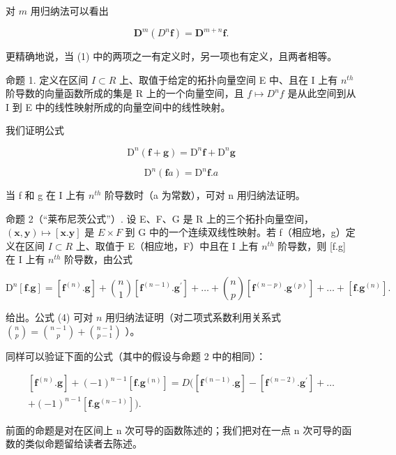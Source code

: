 对 \(m\) 用归纳法可以看出

\[
\mathbf {D} ^ {m} (D ^ {n} \mathbf {f}) = \mathbf {D} ^ {m + n} \mathbf {f}.\tag{1}
\]

更精确地说，当 (1) 中的两项之一有定义时，另一项也有定义，且两者相等。

命题 1. 定义在区间 \(I \subset R\) 上、取值于给定的拓扑向量空间 E 中、且在 I 上有 \(n^{th}\) 阶导数的向量函数所成的集是 R 上的一个向量空间，且 \(f \mapsto D^{n}f\) 是从此空间到从 I 到 E 中的线性映射所成的向量空间中的线性映射。

我们证明公式

\[
\mathrm{D} ^ {n} (\mathbf {f} + \mathbf {g}) = \mathrm{D} ^ {n} \mathbf {f} + \mathrm{D} ^ {n} \mathbf {g}\tag{2}
\]

\[
\mathrm{D} ^ {n} (\mathbf {f} a) = \mathrm{D} ^ {n} \mathbf {f}. a\tag{3}
\]

当 f 和 g 在 I 上有 \(n^{th}\) 阶导数时（a 为常数），可对 n 用归纳法证明。

命题 2（“莱布尼茨公式”）. 设 E、F、G 是 R 上的三个拓扑向量空间，\((\mathbf{x}, \mathbf{y}) \mapsto [\mathbf{x}.\mathbf{y}]\) 是 \(E \times F\) 到 G 中的一个连续双线性映射。若 f（相应地，g）定义在区间 \(I \subset R\) 上、取值于 E（相应地，F）中且在 I 上有 \(n^{th}\) 阶导数，则 {[}f.g{]} 在 I 上有 \(n^{th}\) 阶导数，由公式

\[
\mathrm{D} ^ {n} [ \mathbf {f}. \mathbf {g} ] = [ \mathbf {f} ^ {(n)}. \mathbf {g} ] + \binom {n} {1} [ \mathbf {f} ^ {(n - 1)}. \mathbf {g} ^ {\prime} ] + \dots + \binom {n} {p} [ \mathbf {f} ^ {(n - p)}. \mathbf {g} ^ {(p)} ] + \dots + [ \mathbf {f}. \mathbf {g} ^ {(n)} ].\tag{4}
\]

给出。公式 (4) 可对 \(n\) 用归纳法证明（对二项式系数利用关系式 \(\binom{n}{p} = \binom{n-1}{p} + \binom{n-1}{p-1}\) ）。

同样可以验证下面的公式（其中的假设与命题 2 中的相同）：

\[
\begin{array}{c} [ \mathbf {f} ^ {(n)}. \mathbf {g} ] + (- 1) ^ {n - 1} [ \mathbf {f}. \mathbf {g} ^ {(n)} ] = D \big ([ \mathbf {f} ^ {(n - 1)}. \mathbf {g} ] - [ \mathbf {f} ^ {(n - 2)}. \mathbf {g} ^ {\prime} ] + \dots \\ + (- 1) ^ {n - 1} [ \mathbf {f}. \mathbf {g} ^ {(n - 1)} ] \big). \end{array}\tag{5}
\]

前面的命题是对在区间上 n 次可导的函数陈述的；我们把对在一点 n 次可导的函数的类似命题留给读者去陈述。

